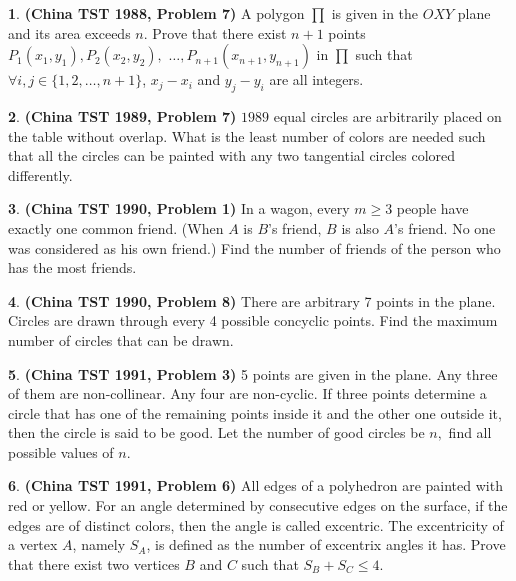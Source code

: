 \documentclass{article}
\theoremstyle{definition}
\newtheorem{p}{}
\begin{document}
\begin{p}{\bf(China TST 1988, Problem 7)}
A polygon $\prod$ is given in the $OXY$ plane and its area exceeds $n.$ Prove that there exist $n+1$ points $P_{1}(x_1, y_1), P_{2}(x_2, y_2),$  $\ldots, P_{n+1}(x_{n+1}, y_{n+1})$ in $\prod$ such that $\forall i,j \in \{1, 2, \ldots, n+1\}$, $x_j - x_i$ and $y_j - y_i$ are all integers.
\end{p}





\begin{p}{\bf(China TST 1989, Problem 7)}
$1989$ equal circles are arbitrarily placed on the table without overlap. What is the least number of colors are needed such that all the circles can be painted with any two tangential circles colored differently.
\end{p}





\begin{p}{\bf(China TST 1990, Problem 1)}
In a wagon, every $m \geq 3$ people have exactly one common friend. (When $A$ is $B$'s friend, $B$ is also $A$'s friend. No one was considered as his own friend.) Find the number of friends of the person who has the most friends.
\end{p}





\begin{p}{\bf(China TST 1990, Problem 8)}
There are arbitrary 7 points in the plane. Circles are drawn through every 4 possible concyclic points. Find the maximum number of circles that can be drawn.
\end{p}

\begin{p}{\bf (China TST 1991, Problem 3)}
5 points are given in the plane. Any three of them are non-collinear. Any four are non-cyclic. If three points determine a circle that has one of the remaining points inside it and the other one outside it, then the circle is said to be good. Let the number of good circles be $n,$ find all possible values of $n.$
\end{p}



\begin{p}{\bf (China TST 1991, Problem 6)}
All edges of a polyhedron are painted with red or yellow. For an angle determined by consecutive edges on the surface, if the edges are of distinct colors, then the angle is called excentric. The excentricity of a vertex $A$, namely $S_A$, is defined as the number of excentrix angles it has. Prove that there exist two vertices $B$ and $C$ such that $S_B + S_C \leq 4$.
\end{p}
\end{document}
